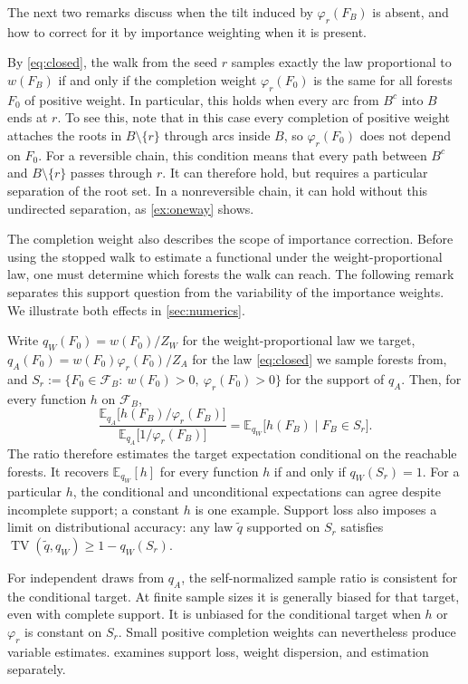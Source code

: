 \documentclass[onefignum,onetabnum,nohypdvips]{siamart250211}
\numberwithin{theorem}{section}
\numberwithin{equation}{section}
\newcommand{\Fset}{\mathcal{F}}
\providecommand{\E}{}\renewcommand{\E}{\mathbb{E}}
\DeclareMathOperator{\TV}{TV}
\begin{document}
The next two remarks discuss when the tilt induced by $\varphi_r(F_B)$ is
absent, and how to correct for it by importance weighting when it is
present.

\begin{remark}\label{rem:unbiased}
By \eqref{eq:closed}, the walk from the seed $r$ samples
exactly the law proportional to $w(F_B)$ if and only if the completion
weight $\varphi_r(F_0)$ is the same for all forests $F_0$ of positive
weight. In particular, this holds when every arc from $B^c$ into $B$
ends at $r$. To see this, note that in this case every completion of
positive weight attaches the roots in $B\setminus\{r\}$ through arcs
inside $B$, so $\varphi_r(F_0)$ does not depend on $F_0$. For a reversible
chain, this condition means that every path between $B^c$ and
$B\setminus\{r\}$ passes through $r$. It can therefore hold, but
requires a particular separation of the root set. In a nonreversible
chain, it can hold without this undirected separation, as
\cref{ex:oneway} shows.

\end{remark}

The completion weight also describes the scope of importance
correction. Before using the stopped walk to estimate a functional
under the weight-proportional law, one must determine which forests
the walk can reach. The following remark separates this support
question from the variability of the importance weights. We
illustrate both effects in \cref{sec:numerics}.

\begin{remark}\label{rem:importance}
Write $q_W(F_0)=w(F_0)/Z_W$ for the weight-proportional law we target,
$q_A(F_0)=w(F_0)\varphi_r(F_0)/Z_A$ for the law \eqref{eq:closed} we
sample forests from, and
$S_r:=\{F_0\in\Fset_B:\ w(F_0)>0,\ \varphi_r(F_0)>0\}$ for the support of
$q_A$. Then, for every function $h$ on $\Fset_B$,
\[
\frac{\E_{q_A}\big[h(F_B)/\varphi_r(F_B)\big]}{\E_{q_A}\big[1/\varphi_r(F_B)\big]}
=\E_{q_W}\big[h(F_B)\mid F_B\in S_r\big].
\]
The ratio therefore estimates the target expectation conditional on
the reachable forests. It recovers $\E_{q_W}[h]$ for every function
$h$ if and only if $q_W(S_r)=1$. For a particular $h$, the conditional
and unconditional expectations can agree despite incomplete support;
a constant $h$ is one example. Support loss also imposes a limit on
distributional accuracy: any law $\widetilde q$ supported on $S_r$
satisfies $\TV(\widetilde q,q_W)\ge 1-q_W(S_r)$.

For independent draws from $q_A$, the self-normalized sample ratio is
consistent for the conditional target. At finite sample sizes it is
generally biased for that target, even with complete support. It is
unbiased for the conditional target when $h$ or $\varphi_r$ is
constant on $S_r$. Small positive completion weights can nevertheless
produce variable estimates.  examines support loss,
weight dispersion, and estimation separately.


\end{remark}
\end{document}
